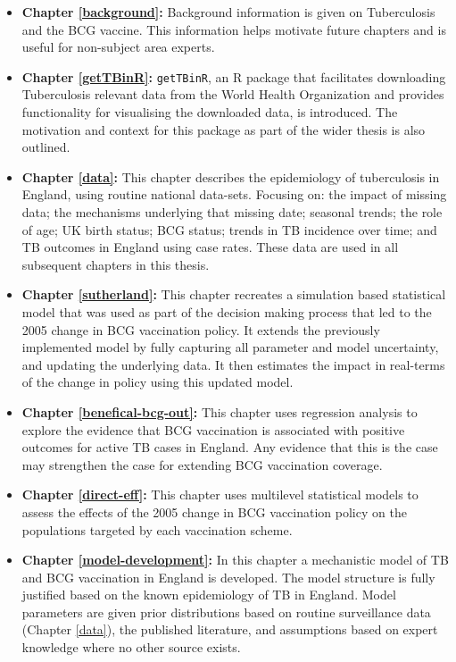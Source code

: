 \documentclass[11pt,twoside]{bristolthesis}
\begin{document}
  \begin{itemize}
  \item
    \textbf{Chapter \ref{background}:} Background information is given on Tuberculosis and the BCG vaccine. This information helps motivate future chapters and is useful for non-subject area experts.
  \item
    \textbf{Chapter \ref{getTBinR}:} \texttt{getTBinR}, an R package that facilitates downloading Tuberculosis relevant data from the World Health Organization and provides functionality for visualising the downloaded data, is introduced. The motivation and context for this package as part of the wider thesis is also outlined.
  \item
    \textbf{Chapter \ref{data}:} This chapter describes the epidemiology of tuberculosis in England, using routine national data-sets. Focusing on: the impact of missing data; the mechanisms underlying that missing date; seasonal trends; the role of age; UK birth status; BCG status; trends in TB incidence over time; and TB outcomes in England using case rates. These data are used in all subsequent chapters in this thesis.
  \item
    \textbf{Chapter \ref{sutherland}:} This chapter recreates a simulation based statistical model that was used as part of the decision making process that led to the 2005 change in BCG vaccination policy. It extends the previously implemented model by fully capturing all parameter and model uncertainty, and updating the underlying data. It then estimates the impact in real-terms of the change in policy using this updated model.
  \item
    \textbf{Chapter \ref{benefical-bcg-out}:} This chapter uses regression analysis to explore the evidence that BCG vaccination is associated with positive outcomes for active TB cases in England. Any evidence that this is the case may strengthen the case for extending BCG vaccination coverage.
  \item
    \textbf{Chapter \ref{direct-eff}:} This chapter uses multilevel statistical models to assess the effects of the 2005 change in BCG vaccination policy on the populations targeted by each vaccination scheme.
  \item
    \textbf{Chapter \ref{model-development}:} In this chapter a mechanistic model of TB and BCG vaccination in England is developed. The model structure is fully justified based on the known epidemiology of TB in England. Model parameters are given prior distributions based on routine surveillance data (Chapter \ref{data}), the published literature, and assumptions based on expert knowledge where no other source exists.

\end{itemize}
\end{document}
